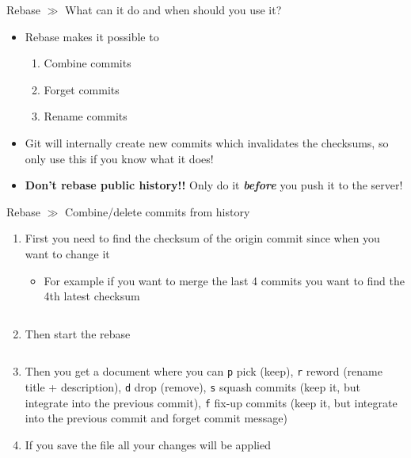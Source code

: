 \documentclass[10pt]{beamer}
\begin{document}
\begin{frame}{Rebase $\gg$ What can it do and when should you use it?}
\begin{center}
\begin{itemize}
\item Rebase makes it possible to
\begin{enumerate}
	\item Combine commits
	\item Forget commits
	\item Rename commits
\end{enumerate}
\item Git will internally create new commits which invalidates the checksums, so only use this if you know what it does!
\item \textbf{Don't rebase public history!!} Only do it \textbf{\textit{before}} you push it to the server!
\end{itemize}
\end{center}
\end{frame}

\begin{frame}{Rebase $\gg$ Combine/delete commits from history}
\begin{center}
	\begin{enumerate}
		\item First you need to find the checksum of the origin commit since when you want to change it
		\begin{itemize}
			\item For example if you want to merge the last 4 commits you want to find the 4th latest checksum
		\end{itemize}
	\inputminted[bgcolor=lightGreyCustom,fontsize=\scriptsize]{sh}{./resources/git_rebase_01_checksums.sh}
	\item Then start the rebase
	\inputminted[bgcolor=lightGreyCustom,fontsize=\scriptsize]{sh}{./resources/git_rebase_02_rebase.sh}
	\item Then you get a document where you can \texttt{p} pick (keep), \texttt{r} reword (rename title + description), \texttt{d} drop (remove), \texttt{s} squash commits (keep it, but integrate into the previous commit), \texttt{f} fix-up commits (keep it, but integrate into the previous commit and forget commit message)
	\item If you save the file all your changes will be applied
	\end{enumerate}
\end{center}
\end{frame}
\end{document}
